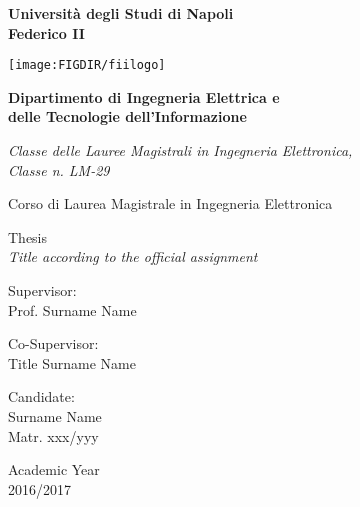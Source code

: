 \documentclass[12pt, a4paper]{report}
\begin{document}
\pagestyle{empty}
\begin{center}

%

{\bfseries\Huge Università degli Studi di Napoli\\}
\vspace{2.54mm}
{\bfseries\Huge Federico II\\}
\vspace{5mm}

\centerline{\mbox{\texttt{[image: \\FIGDIR/fiilogo]}}}

\medskip
{\bfseries\LARGE Dipartimento di Ingegneria Elettrica e\\}
\vspace{2.54mm}
{\bfseries\LARGE delle Tecnologie dell'Informazione\\}
\vspace{2.54mm}

{\emph{\large Classe delle Lauree Magistrali in Ingegneria Elettronica,\\}}
{\emph{\large Classe n. LM-29\\}}
\vspace{2.54mm}

{\large Corso di Laurea Magistrale in Ingegneria Elettronica\\}
\vspace{5mm}


%
%

\vfill
{\Large Thesis\\}
\vspace{4mm}
{\emph{\LARGE Title according to the official assignment\\}}		%
\vspace{4mm}

\vfill

\begin{multicols}{2}
	{\large Supervisor:\\}
	Prof. Surname Name\\
	\vspace{5mm}
	
	{\large Co-Supervisor:\\}
	Title Surname Name\\
	\vspace{5mm}
	
	{\large Candidate:\\}
	Surname Name\\
	Matr. xxx/yyy\\
	\vspace{10mm}
\end{multicols}

\vfill

{\large Academic Year\\ 2016/2017}

\end{center}
\end{document}
